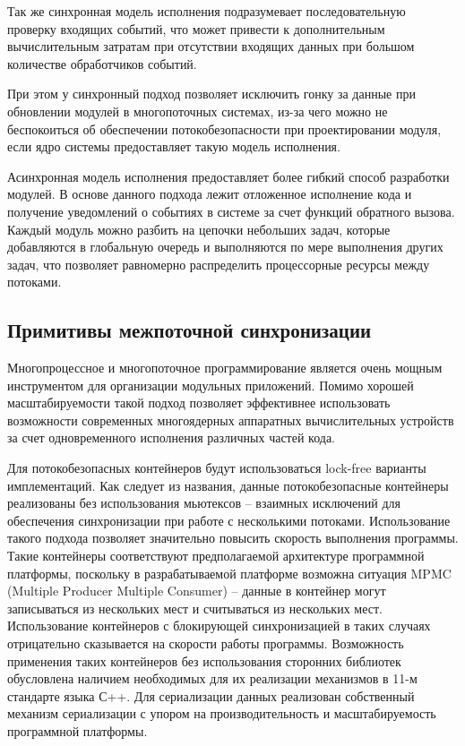 Так же синхронная модель исполнения подразумевает последовательную проверку входящих событий, что может привести к дополнительным вычислительным затратам при отсутствии входящих данных при большом количестве обработчиков событий.

При этом у синхронный подход позволяет исключить гонку за данные при обновлении модулей в многопоточных системах, из-за чего можно не беспокоиться об обеспечении потокобезопасности при проектировании модуля, если ядро системы предоставляет такую модель исполнения.

Асинхронная модель исполнения предоставляет более гибкий способ разработки модулей. В основе данного подхода лежит отложенное исполнение кода и получение уведомлений о событиях в системе за счет функций обратного вызова. Каждый модуль можно разбить на цепочки небольших задач, которые добавляются в глобальную очередь и выполняются по мере выполнения других задач, что позволяет равномерно распределить процессорные ресурсы между потоками.

\subsection{Примитивы межпоточной синхронизации}

Многопроцессное и многопоточное программирование является очень мощным инструментом для организации модульных приложений. Помимо хорошей масштабируемости такой подход позволяет эффективнее использовать возможности современных многоядерных аппаратных вычислительных устройств за счет одновременного исполнения различных частей кода.

Для потокобезопасных контейнеров будут использоваться lock-free варианты имплементаций. Как следует из названия, данные потокобезопасные контейнеры реализованы без использования мьютексов – взаимных исключений для обеспечения синхронизации при работе с несколькими потоками. Использование такого подхода позволяет значительно повысить скорость выполнения программы. Такие контейнеры соответствуют предполагаемой архитектуре программной платформы, поскольку в разрабатываемой платформе возможна ситуация MPMC (Multiple Producer Multiple Consumer) – данные в контейнер могут записываться из нескольких мест и считываться из нескольких мест. Использование контейнеров с блокирующей синхронизацией в таких случаях отрицательно сказывается на скорости работы программы. Возможность применения таких контейнеров без использования сторонних библиотек обусловлена наличием необходимых для их реализации механизмов в 11-м стандарте языка С++. Для сериализации данных реализован собственный механизм сериализации с упором на производительность и масштабируемость программной платформы.

